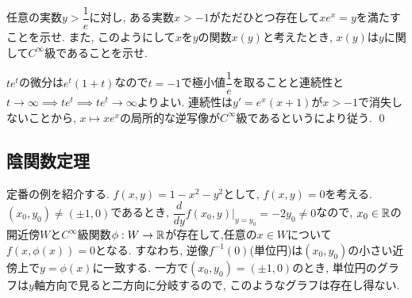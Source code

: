\begin{egprob}
任意の実数$y>\dfrac{1}{e}$に対し, ある実数$x>-1$がただひとつ存在して$xe^{x} = y$を満たすことを示せ. また, このようにして$x$を$y$の関数$x(y)$と考えたとき, $x(y)$は$y$に関して$C^{\infty}$級であることを示せ.
\end{egprob}
\begin{egans}
$te^t$の微分は$e^t(1+t)$なので$t=-1$で極小値$\dfrac{1}{e}$を取ることと連続性と$t\to \infty \implies te^t \implies te^t \to \infty$よりよい. 連続性は$y' = e^x(x+1)$が$x>-1$で消失しないことから,  $x\mapsto xe^x$の局所的な逆写像が$C^{\infty}$級であるというにより従う. \qed
\end{egans}


\subsection{陰関数定理}


\begin{eg}
定番の例を紹介する. $f(x,y) = 1-x^2-y^2$として, $f(x,y) = 0$を考える. $(x_0,y_0) \neq (\pm 1,0)$であるとき, $\dfrac{d}{dy}f(x_0,y)|_{y=y_0} = -2y_0 \neq 0$なので, $x_0\in \mathbb{R}$の開近傍$W$と$C^{\infty}$級関数$\phi:W\to \mathbb{R}$が存在して,任意の$x\in W$について $f(x,\phi(x)) = 0$となる. すなわち, 逆像$f^{-1}(0)$(単位円)は$(x_0,y_0)$の小さい近傍上で$y=\phi(x)$に一致する. 一方で$(x_0,y_0) = (\pm 1,0)$のとき, 単位円のグラフは$y$軸方向で見ると二方向に分岐するので, このようなグラフは存在し得ない.
\end{eg}

